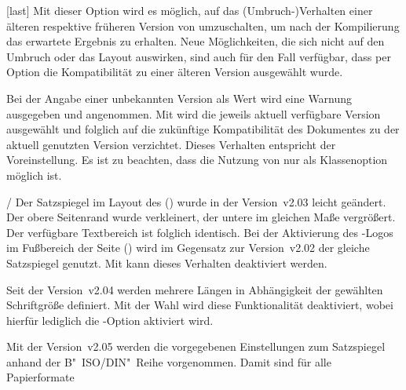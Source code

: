 \begin{Declaration*}{}
\begin{Declaration*}{}
\begin{Declaration*}{}
\begin{Declaration}[v2.03]{}[last]
\printdeclarationlist%
%
%
Mit dieser Option wird es möglich, auf das (Umbruch-)Verhalten einer älteren 
respektive früheren Version von \TUDScript umzuschalten, um nach der 
Kompilierung das erwartete Ergebnis zu erhalten. Neue Möglichkeiten, die sich 
nicht auf den Umbruch oder das Layout auswirken, sind auch für den Fall 
verfügbar, dass per Option die Kompatibilität zu einer älteren Version 
ausgewählt wurde. 

Bei der Angabe einer unbekannten Version als Wert wird eine Warnung ausgegeben 
und  angenommen. Mit  wird die 
jeweils aktuell verfügbare Version ausgewählt und folglich auf die zukünftige 
Kompatibilität des Dokumentes zu der aktuell genutzten Version verzichtet. 
Dieses Verhalten entspricht der Voreinstellung. Es ist zu beachten, dass die 
Nutzung von  nur als Klassenoption möglich ist.
%
\begin{values}{}
\item[\PValue{first}/\PValue{2.02}]
  Der Satzspiegel im Layout des \CDs () wurde in 
  der Version~v2.03 leicht geändert. Der obere Seitenrand wurde verkleinert, 
  der untere im gleichen Maße vergrößert. Der verfügbare Textbereich ist 
  folglich identisch. Bei der Aktivierung des \DDC-Logos im Fußbereich der 
  Seite () wird im Gegensatz zur Version~v2.02 der 
  gleiche Satzspiegel genutzt. Mit  kann dieses 
  Verhalten deaktiviert werden.
\item[\PValue{2.03}]
  Seit der Version~v2.04 werden mehrere Längen in Abhängigkeit der gewählten 
  Schriftgröße definiert. Mit der Wahl  wird diese 
  Funktionalität deaktiviert, wobei hierfür lediglich die \TUDScript-Option 
   aktiviert wird. 
\item[\PValue{2.04}]
  Mit der Version~v2.05 werden die vorgegebenen Einstellungen zum Satzspiegel 
  anhand der B"~ISO/DIN"~Reihe vorgenommen. Damit sind für alle Papierformate 

\end{values}
\end{Declaration}
\end{Declaration*}
\end{Declaration*}
\end{Declaration*}
